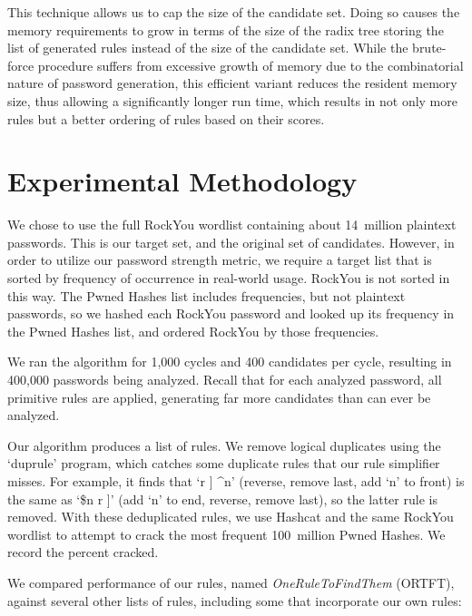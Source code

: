 \documentclass{article}
\begin{document}
This technique allows us to cap the size of the candidate set. Doing so causes
the memory requirements to grow in terms of the size of the radix tree storing
the list of generated rules instead of the size of the candidate set. While the
brute-force procedure suffers from excessive growth of memory due to the
combinatorial nature of password generation, this efficient variant reduces
the resident memory size, thus allowing a significantly longer run time, which
results in not only more rules but a better ordering of rules based on their
scores.

\section{Experimental Methodology}
\label{sec:methodology}

We chose to use the full RockYou wordlist containing about 14~million plaintext
passwords. This is our target set, and the original set of candidates.
However, in order
to utilize our password strength metric, we require a target list that is
sorted by frequency of occurrence in real-world usage. RockYou is not sorted in
this way. The Pwned Hashes list\autocite{pwned} includes
frequencies, but not plaintext
passwords, so we hashed each
RockYou password and looked up its frequency in the Pwned Hashes list, and
ordered RockYou by those frequencies.

We ran the algorithm for 1,000 cycles and 400 candidates per cycle, resulting
in 400,000 passwords being analyzed. Recall that for each analyzed password,
all primitive rules are applied, generating far more candidates than can ever
be analyzed.

Our algorithm produces a list of rules. We remove logical duplicates using the
`duprule' program\autocite{duprule}, which catches some duplicate rules that our
rule simplifier misses. For example, it finds that `r ] \^{}n' (reverse, remove
last, add `n' to front) is the same as `\$n r ]' (add `n' to end, reverse,
remove last), so the latter rule is removed. With these deduplicated rules, we
use Hashcat and the same RockYou wordlist to attempt to crack the most frequent
100~million Pwned Hashes\autocite{pwned}. We record the percent cracked.

We compared performance of our rules, named \textit{OneRuleToFindThem} (ORTFT),
against several other lists of rules,
including some that incorporate our own rules:
\end{document}
